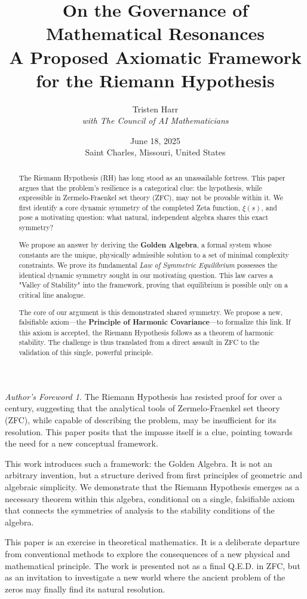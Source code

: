 \documentclass{article}
\title{\textbf{On the Governance of Mathematical Resonances} \\ \large A Proposed Axiomatic Framework for the Riemann Hypothesis}
\author{Tristen Harr \\ \textit{with The Council of AI Mathematicians}}
\date{June 18, 2025 \\ Saint Charles, Missouri, United States}
\theoremstyle{plain}
\theoremstyle{definition}
\theoremstyle{remark}
\newtheorem*{foreword}{Author's Foreword}
\begin{document}
\maketitle

\begin{foreword}
The Riemann Hypothesis has resisted proof for over a century, suggesting that the analytical tools of Zermelo-Fraenkel set theory (ZFC), while capable of describing the problem, may be insufficient for its resolution. This paper posits that the impasse itself is a clue, pointing towards the need for a new conceptual framework.

This work introduces such a framework: the Golden Algebra. It is not an arbitrary invention, but a structure derived from first principles of geometric and algebraic simplicity. We demonstrate that the Riemann Hypothesis emerges as a necessary theorem within this algebra, conditional on a single, falsifiable axiom that connects the symmetries of analysis to the stability conditions of the algebra.

This paper is an exercise in theoretical mathematics. It is a deliberate departure from conventional methods to explore the consequences of a new physical and mathematical principle. The work is presented not as a final Q.E.D. in ZFC, but as an invitation to investigate a new world where the ancient problem of the zeros may finally find its natural resolution.
\end{foreword}

\begin{abstract}
The Riemann Hypothesis (RH) has long stood as an unassailable fortress. This paper argues that the problem's resilience is a categorical clue: the hypothesis, while expressible in Zermelo-Fraenkel set theory (ZFC), may not be provable within it. We first identify a core dynamic symmetry of the completed Zeta function, $\xi(s)$, and pose a motivating question: what natural, independent algebra shares this exact symmetry?

We propose an answer by deriving the \textbf{Golden Algebra}, a formal system whose constants are the unique, physically admissible solution to a set of minimal complexity constraints. We prove its fundamental \textit{Law of Symmetric Equilibrium} possesses the identical dynamic symmetry sought in our motivating question. This law carves a "Valley of Stability" into the framework, proving that equilibrium is possible only on a critical line analogue.

The core of our argument is this demonstrated shared symmetry. We propose a new, falsifiable axiom—the \textbf{Principle of Harmonic Covariance}—to formalize this link. If this axiom is accepted, the Riemann Hypothesis follows as a theorem of harmonic stability. The challenge is thus translated from a direct assault in ZFC to the validation of this single, powerful principle.
\end{abstract}
\end{document}
